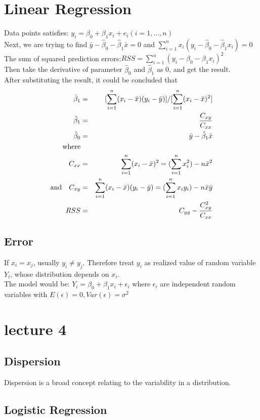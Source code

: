 \documentclass[12pt,a4paper]{article}
\begin{document}
\section*{Linear Regression}
Data points satisfies: $y_i=\beta_0+\beta_1x_i+e_i(i=1,\ldots,n)$\\
Next, we are trying to find $\bar y-\hat \beta_0-\hat\beta_1\bar x=0$ and $\sum_{i=1}^{n}x_i(y_i-\hat \beta_0-\hat \beta_1x_i)=0$
The sum of squared prediction errors:$RSS= \sum_{i=1}^{n}(y_i-\beta_0-\beta_1x_i)^2$ \\
Then take the derivative of parameter $\hat \beta_0$ and $\hat \beta_1$ as 0, and get the result.\\
After substituting the result, it could be concluded that 
\begin{eqnarray*}
\hat \beta_1 &=& [\sum_{i=1}^{n}(x_i-\bar x)(y_i-\bar y)]/[\sum_{i=1}^{n}(x_i-\bar x)^2] \\
\hat \beta_1 &=& \frac{C_{xy}}{C_{xx}} \\
\hat \beta_0 &=& \bar y-\hat \beta_1\bar x\\
{\rm where} \\
C_{xx} &=& \sum_{i=1}^{n}(x_i-\bar x)^2 = (\sum_{i=1}^{n}x_i^2)-n\bar x^2\\
{\rm and}\quad C_{xy} &=& \sum_{i=1}^{n}(x_i-\bar x)(y_i-\bar y)=(\sum_{i=1}^{n}x_iy_i)-n\bar x\bar y\\
RSS &=& C_{yy}-\frac{C_{xy}^2}{C_{xx}}
\end{eqnarray*}
\subsection*{Error}
If $x_i=x_j$, usually $y_i\neq y_j$. Therefore treat $y_i$ as realized value of random variable $Y_i$, whose distribution depends on $x_i$.\\
The model would be: $Y_i = \beta_0+\beta_1x_i+\epsilon_i$ where $\epsilon_i$ are independent random variables with $E(\epsilon)=0, Var(\epsilon)=\sigma^2$
\section*{lecture 4}
\subsection*{Dispersion}
Dispersion is a broad concept relating to the variability in a distribution.
\subsection*{Logistic Regression}
\end{document}
